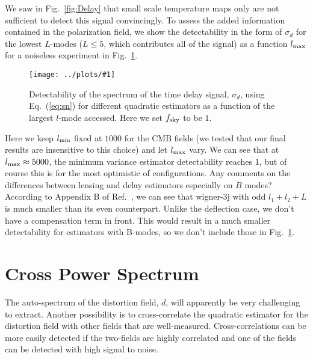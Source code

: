 \documentclass[prl,amsmath,amssymb,floatfix,superscriptaddress,nofootinbib,twocolumn]{revtex4-1}
\newcommand{\ec}[1]{Eq.~(\ref{eq:#1})}
\newcommand{\sfig}[2]{
\texttt{[image: ../plots/\#1]}
        }
\newcommand{\Sfig}[2]{
   \begin{figure}[thbp]
   \begin{center}
    \sfig{#1.pdf}{\columnwidth}
    \caption{{\small #2}}
    \label{fig:#1}
     \end{center}
   \end{figure}
}
\newcommand{\rf}[1]{\ref{fig:#1}}
\newcommand{\wh}[1]{{\color{red} #1}}
\begin{document}
We saw in Fig.~\rf{Delay} that small scale temperature maps only are not sufficient to detect this signal convincingly. To assess the added information contained in the polarization field, we show the detectability in the form of $\sigma_d$ for the lowest $L$-modes ($L\leqslant 5$, which contributes all of the signal) as a function $l_{\rm max}$ for a noiseless experiment in Fig.~\rf{StoN}.

\Sfig{StoN}{Detectability of the spectrum of the time delay signal, $\sigma_d$, using \ec{sn} for different quadratic estimators as a function of the largest $l$-mode accessed. Here we set $f_{\rm sky}$ to be $1$.}
Here we keep $l_{\rm min}$ fixed at $1000$ for the CMB fields (we tested that our final results are insensitive to this choice) and let $l_{\rm max}$ vary.
We can see that at $l_{\rm max} \approx 5000$, the minimum variance estimator detectability reaches 1, but of course this is for the most optimistic of configurations. \wh{%
Any comments on the differences between lensing and delay estimators especially on $B$ modes?} %
According to Appendix B of Ref.~\cite{Hu:2000xe}, we can see that wigner-3j with odd $l_{1}+l_{2}+L$ is much smaller than its even counterpart. Unlike the deflection case, we don't have a compensation term in front. This would result in a much smaller detectability for estimators with B-modes, so we don't include those in Fig.~\rf{StoN}.

\section{Cross Power Spectrum}
The auto-spectrum of the distortion field, $d$, will apparently be very challenging to extract. Another possibility is to cross-correlate the quadratic estimator for the distortion field with other fields that are well-measured. Cross-correlations can be more easily detected if the two-fields are highly correlated and one of the fields can be detected with high signal to noise. 
\end{document}
